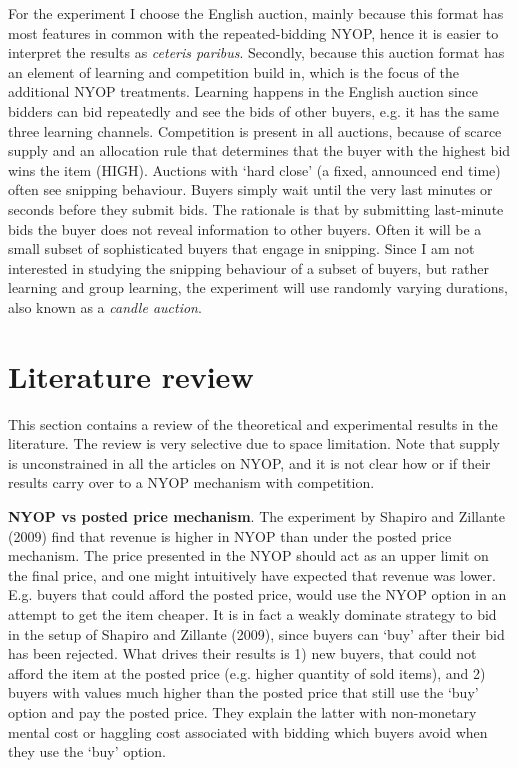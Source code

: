 \documentclass[a4paper,12pt]{article}
\begin{document}
	For the experiment I choose the English auction, mainly because this format has most features in common with the repeated-bidding NYOP, hence it is easier to interpret the results as {\it ceteris paribus}. Secondly, because this auction format has an element of learning and competition build in, which is the focus of the additional NYOP treatments. Learning happens in the English auction since bidders can bid repeatedly and see the bids of other buyers, e.g. it has the same three learning channels. Competition is present in all auctions, because of scarce supply and an allocation rule that determines that the buyer with the highest bid wins the item (HIGH). Auctions with `hard close' (a fixed, announced end time) often see snipping behaviour. Buyers simply wait until the very last minutes or seconds before they submit bids. The rationale is that by submitting last-minute bids the buyer does not reveal information to other buyers. Often it will be a small subset of sophisticated buyers that engage in snipping. Since I am not interested in studying the snipping behaviour of a subset of buyers, but rather learning and group learning, the experiment will use randomly varying durations, also known as a {\it candle auction}.

	\section{Literature review}

	This section contains a review of the theoretical and experimental results in the literature. The review is very selective due to space limitation. Note that supply is unconstrained in all the articles on NYOP, and it is not clear how or if their results carry over to a NYOP mechanism with competition.

	{\bf NYOP vs posted price mechanism}. The experiment by Shapiro and Zillante (2009) find that revenue is higher in NYOP than under the posted price mechanism. The price presented in the NYOP should act as an upper limit on the final price, and one might intuitively have expected that revenue was lower. E.g. buyers that could afford the posted price, would use the NYOP option in an attempt to get the item cheaper. It is in fact a weakly dominate strategy to bid in the setup of Shapiro and Zillante (2009), since buyers can `buy' after their bid has been rejected. What drives their results is 1) new buyers, that could not afford the item at the posted price (e.g. higher quantity of sold items), and 2) buyers with values much higher than the posted price that still use the `buy' option and pay the posted price. They explain the latter with non-monetary mental cost or haggling cost associated with bidding which buyers avoid when they use the `buy' option.
\end{document}
